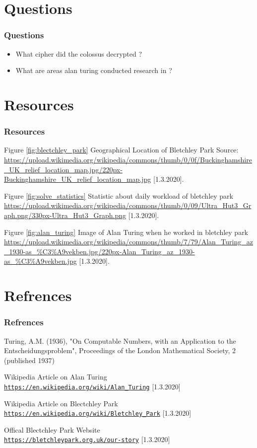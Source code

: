 \documentclass[10pt,]{beamer}
\begin{document}
\section{ Questions }
\begin{frame}[fragile] %
\frametitle{Questions} %
	\begin{itemize}
		\item What cipher did the colossus decrypted ?
		
		\item What are areas alan turing conducted research in ?
	\end{itemize}		
\end{frame}


\section{ Resources}
\begin{frame}[fragile] %
\frametitle{Resources} %
 Figure \ref{fig:blectchley_park} Geographical Location of Bletchley Park Source: \url{https://upload.wikimedia.org/wikipedia/commons/thumb/0/0f/Buckinghamshire_UK_relief_location_map.jpg/220px-Buckinghamshire_UK_relief_location_map.jpg} [1.3.2020]. \newline
 
 Figure \ref{fig:solve_statistics} Statistic about daily workload of bletchley park \url{https://upload.wikimedia.org/wikipedia/commons/thumb/0/09/Ultra_Hut3_Graph.png/330px-Ultra_Hut3_Graph.png} [1.3.2020].  \newline
 
 Figure \ref{fig:alan_turing} Image of Alan Turing when he worked in bletchley park \url{https://upload.wikimedia.org/wikipedia/commons/thumb/7/79/Alan_Turing_az_1930-as_%C3%A9vekben.jpg/220px-Alan_Turing_az_1930-as_%C3%A9vekben.jpg} [1.3.2020].
\end{frame}


\section{ Refrences}
\begin{frame}[fragile] %
	\frametitle{Refrences} %
		
	\begin{thebibliography}{9}
Turing, A.M. (1936), "On Computable Numbers, with an Application to the Entscheidungsproblem", Proceedings of the London Mathematical Society, 2 (published 1937)

Wikipedia Article on Alan Turing \\\texttt{\url{https://en.wikipedia.org/wiki/Alan_Turing}} [1.3.2020]

Wikipedia Article on Blectchley Park \\\texttt{\url{https://en.wikipedia.org/wiki/Bletchley_Park}} [1.3.2020]

Offical Blectchley Park Website \\\texttt{\url{https://bletchleypark.org.uk/our-story}} [1.3.2020]

\end{thebibliography}	
\end{frame}
\end{document}
